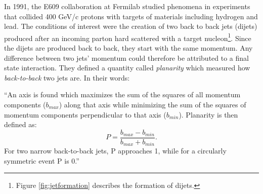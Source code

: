 In 1991, the E609 collaboration at Fermilab studied phenomena in experiments that collided 400 GeV/c protons with targets of materials including hydrogen and lead\citep{Corcoran:1990vq}. The conditions of interest were the creation of two back to back jets (dijets) produced after an incoming parton hard scattered with a target nucleon\footnote{Figure \ref{fig:jetformation} describes the formation of dijets.}. Since the dijets are produced back to back, they start with the same momentum. Any difference between two jets' momentum could therefore be attributed to a final state interaction. They defined a quantity called \textit{planarity} which measured how \textit{back-to-back} two jets are. In their words:
\begin{addmargin}[1.5em]{2em}
``An axis is found which maximizes the sum of the squares of all momentum components ($b_{max}$) along that axis while minimizing the sum of the squares of momentum components perpendicular to that axis ($b_{min}$). Planarity is then defined as: 
\begin{equation}
P = \frac{b_{max}-b_{min}}{b_{max}+b_{min}}.
\end{equation}
For two narrow back-to-back jets, P approaches 1, while for a circularly symmetric event P is 0.''
\end{addmargin}

